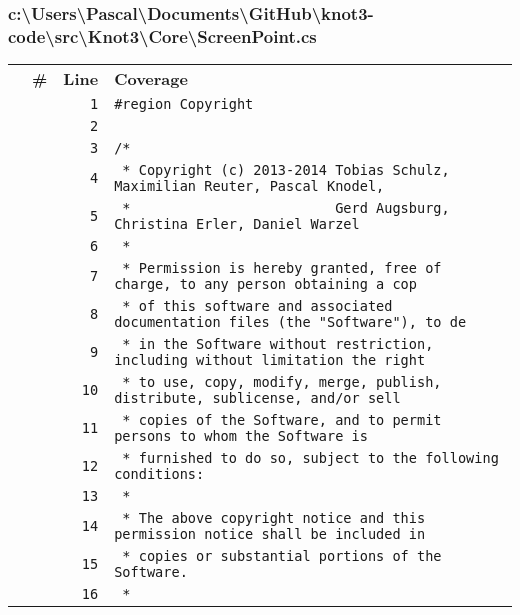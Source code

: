 \documentclass[a4paper,10pt]{article}
\begin{document}
\subsubsection{c:\textbackslash Users\textbackslash Pascal\textbackslash Documents\textbackslash GitHub\textbackslash knot3-code\textbackslash src\textbackslash Knot3\textbackslash Core\textbackslash ScreenPoint.cs}
\begin{longtable}[l]{lrrl}
\textbf{} & \textbf{\#} & \textbf{Line} & \textbf{Coverage}\\
\cellcolor{gray} &  & \verb~1~ & \verb~#region Copyright~\\
\cellcolor{gray} &  & \verb~2~ & \verb~~\\
\cellcolor{gray} &  & \verb~3~ & \verb~/*~\\
\cellcolor{gray} &  & \verb~4~ & \verb~ * Copyright (c) 2013-2014 Tobias Schulz, Maximilian Reuter, Pascal Knodel,~\\
\cellcolor{gray} &  & \verb~5~ & \verb~ *                         Gerd Augsburg, Christina Erler, Daniel Warzel~\\
\cellcolor{gray} &  & \verb~6~ & \verb~ *~\\
\cellcolor{gray} &  & \verb~7~ & \verb~ * Permission is hereby granted, free of charge, to any person obtaining a cop~\\
\cellcolor{gray} &  & \verb~8~ & \verb~ * of this software and associated documentation files (the "Software"), to de~\\
\cellcolor{gray} &  & \verb~9~ & \verb~ * in the Software without restriction, including without limitation the right~\\
\cellcolor{gray} &  & \verb~10~ & \verb~ * to use, copy, modify, merge, publish, distribute, sublicense, and/or sell~\\
\cellcolor{gray} &  & \verb~11~ & \verb~ * copies of the Software, and to permit persons to whom the Software is~\\
\cellcolor{gray} &  & \verb~12~ & \verb~ * furnished to do so, subject to the following conditions:~\\
\cellcolor{gray} &  & \verb~13~ & \verb~ *~\\
\cellcolor{gray} &  & \verb~14~ & \verb~ * The above copyright notice and this permission notice shall be included in ~\\
\cellcolor{gray} &  & \verb~15~ & \verb~ * copies or substantial portions of the Software.~\\
\cellcolor{gray} &  & \verb~16~ & \verb~ *~\\

\end{longtable}
\end{document}
